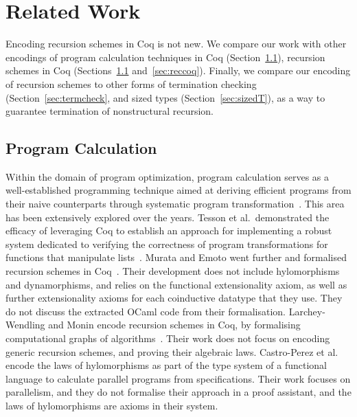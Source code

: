 \documentclass[ a4paper, UKenglish, cleveref, autoref, thm-restate]{lipics-v2021}
\begin{document}
\section{Related Work}
%
Encoding recursion schemes in Coq is not new. We compare our work with other
encodings of program calculation techniques in Coq (Section~\ref{sec:calccoq}),
recursion schemes in Coq (Sections~\ref{sec:calccoq} and~\ref{sec:reccoq}).
Finally, we compare our encoding of recursion schemes to other forms of
termination checking (Section~\ref{sec:termcheck}, and sized types
(Section~\ref{sec:sizedT}), as a way to guarantee termination of nonstructural
recursion.


\subsection{Program Calculation}\label{sec:calccoq}

Within the domain of program optimization, program calculation serves as a
well-established programming technique aimed at deriving efficient programs
from their naive counterparts through systematic program
transformation~\cite{gibbonsSquiggol}. This area has been extensively explored
over the years. Tesson et al.\ demonstrated the efficacy of leveraging Coq to
establish an approach for implementing a robust system dedicated to verifying
the correctness of program transformations for functions that manipulate
lists~\cite{10.1007/978-3-642-17796-5_10}. Murata and Emoto went further and
formalised recursion schemes in Coq~\cite{MurataE19}. Their development does
not include hylomorphisms and dynamorphisms, and relies on the functional
extensionality axiom, as well as further extensionality axioms for each
coinductive datatype that they use. They do not discuss the extracted OCaml
code from their formalisation.  Larchey-Wendling and Monin encode recursion
schemes in Coq, by formalising computational graphs of
algorithms~\cite{larchey2022braga}. Their work does not focus on encoding
generic recursion schemes, and proving their algebraic laws.  Castro-Perez et
al.~\cite{farmsCastro} encode the laws of hylomorphisms as part of the type
system of a functional language to calculate parallel programs from
specifications. Their work focuses on parallelism, and they do not formalise
their approach in a proof assistant, and the laws of hylomorphisms are axioms
in their system.
\end{document}
